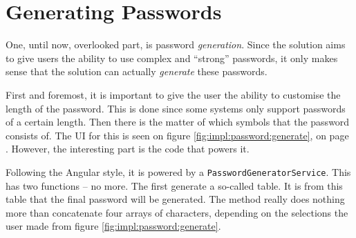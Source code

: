 




	\section{Generating Passwords}
		One, until now, overlooked part, is password \emph{generation}. Since the solution aims to give users the ability to use complex and ``strong'' passwords, it only makes sense that the solution can actually \emph{generate} these passwords.

		First and foremost, it is important to give the user the ability to customise the length of the password. This is done since some systems only support passwords of a certain length. Then there is the matter of which symbols that the password consists of. The UI for this is seen on figure \ref{fig:impl:password:generate}, on page \pageref{fig:impl:password:generate}. However, the interesting part is the code that powers it.

		Following the Angular style, it is powered by a \verb=PasswordGeneratorService=. This has two functions -- no more. The first generate a so-called table. It is from this table that the final password will be generated. The method really does nothing more than concatenate four arrays of characters, depending on the selections the user made from figure \ref{fig:impl:password:generate}.

